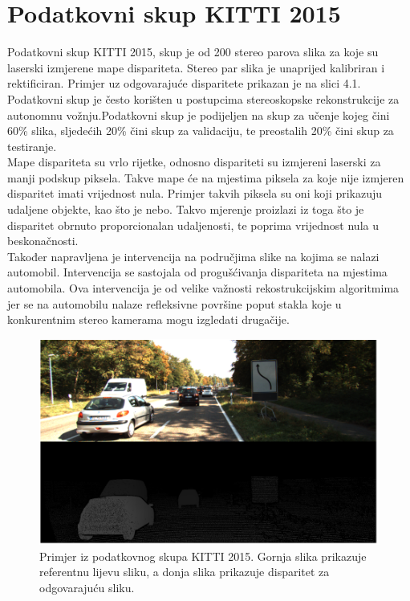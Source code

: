 \documentclass[times, utf8, zavrsni, numeric]{fer}
\begin{document}
\section{Podatkovni skup KITTI 2015}
Podatkovni skup KITTI 2015, skup je od 200 stereo parova slika za koje su laserski izmjerene mape dispariteta. Stereo par slika je unaprijed kalibriran i rektificiran. Primjer uz odgovarajuće disparitete prikazan je na slici 4.1. Podatkovni skup je često korišten u postupcima stereoskopske rekonstrukcije za autonomnu vožnju.Podatkovni skup je podijeljen na skup za učenje kojeg čini 60\% slika, sljedećih 20\% čini skup za validaciju, te preostalih 20\% čini skup za testiranje.\\
Mape dispariteta su vrlo rijetke, odnosno dispariteti su izmjereni laserski za manji podskup piksela. Takve mape će na mjestima piksela za koje nije izmjeren disparitet imati vrijednost nula. Primjer takvih piksela su oni koji prikazuju udaljene objekte, kao što je nebo. Takvo mjerenje proizlazi iz toga što je disparitet obrnuto proporcionalan udaljenosti, te poprima vrijednost nula u beskonačnosti. \\
Također napravljena je intervencija na područjima slike na kojima se nalazi automobil. Intervencija se sastojala od progušćivanja dispariteta na mjestima automobila. Ova intervencija je od velike važnosti rekostrukcijskim algoritmima jer se na automobilu nalaze refleksivne površine poput stakla koje u konkurentnim stereo kamerama mogu izgledati drugačije.\cite{zbontar}
\begin{figure}[htb]
\centering
\includegraphics[width = 14.5cm]{img/slika11.png}
\caption{Primjer iz podatkovnog skupa KITTI 2015. Gornja slika prikazuje referentnu lijevu sliku, a donja slika prikazuje disparitet za odgovarajuću sliku.}
\label{fig:KITTI}
\end{figure}
\end{document}
